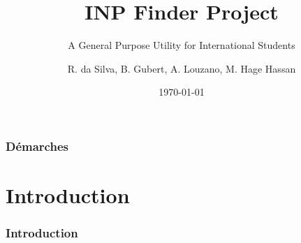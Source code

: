 \documentclass{beamer}
\title[INP Finder Project]{INP Finder Project}
\subtitle{A General Purpose Utility for International Students}
\author{R. da Silva, B. Gubert, A. Louzano, M. Hage Hassan} %
\institute[Phelma] %
{
Grenoble Institute of Technology - Phelma\\ %
\medskip
\iffalse
\textit{mohamed.hage-hassan@phelma.grenoble-inp.fr}\\ %
\textit{ferdinand.goumis@phelma.grenoble-inp.fr}
\fi
}
\date{\today} %
\begin{document}
\begin{frame}
\titlepage %
\end{frame}


\begin{frame}
\frametitle{D\'emarches}

\tableofcontents

\end{frame}

\section{Introduction} %
\begin{frame}
\frametitle{Introduction}


\end{frame}
\end{document}
